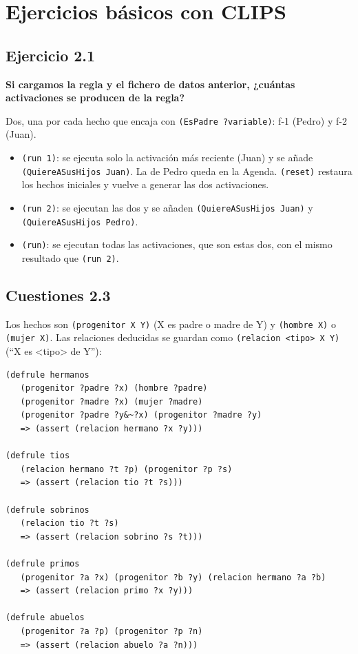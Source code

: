 \section{Ejercicios básicos con CLIPS}

\subsection{Ejercicio 2.1}

\textbf{Si cargamos la regla y el fichero de datos anterior, ¿cuántas activaciones se producen de la regla?}

Dos, una por cada hecho que encaja con \texttt{(EsPadre ?variable)}: f-1 (Pedro) y f-2 (Juan).

\begin{itemize}
\item \texttt{(run 1)}: se ejecuta solo la activación más reciente (Juan) y se añade \texttt{(QuiereASusHijos Juan)}. La de Pedro queda en la Agenda. \texttt{(reset)} restaura los hechos iniciales y vuelve a generar las dos activaciones.
\item \texttt{(run 2)}: se ejecutan las dos y se añaden \texttt{(QuiereASusHijos Juan)} y \texttt{(QuiereASusHijos Pedro)}.
\item \texttt{(run)}: se ejecutan todas las activaciones, que son estas dos, con el mismo resultado que \texttt{(run 2)}.
\end{itemize}

\subsection{Cuestiones 2.3}

Los hechos son \texttt{(progenitor X Y)} (X es padre o madre de Y) y \texttt{(hombre X)} o \texttt{(mujer X)}. Las relaciones deducidas se guardan como \texttt{(relacion <tipo> X Y)} (``X es <tipo> de Y''):

\begin{lstlisting}
(defrule hermanos
   (progenitor ?padre ?x) (hombre ?padre)
   (progenitor ?madre ?x) (mujer ?madre)
   (progenitor ?padre ?y&~?x) (progenitor ?madre ?y)
   => (assert (relacion hermano ?x ?y)))

(defrule tios
   (relacion hermano ?t ?p) (progenitor ?p ?s)
   => (assert (relacion tio ?t ?s)))

(defrule sobrinos
   (relacion tio ?t ?s)
   => (assert (relacion sobrino ?s ?t)))

(defrule primos
   (progenitor ?a ?x) (progenitor ?b ?y) (relacion hermano ?a ?b)
   => (assert (relacion primo ?x ?y)))

(defrule abuelos
   (progenitor ?a ?p) (progenitor ?p ?n)
   => (assert (relacion abuelo ?a ?n)))
\end{lstlisting}

